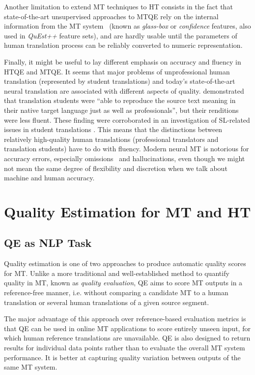 Another limitation to extend MT techniques to HT consists in the fact that state-of-the-art unsupervised approaches to \gls{MTQE} rely on the internal information from the MT system~\cite{Fomicheva2020} (known as \textit{glass-box} or \textit{confidence} features, also used in \textit{QuEst++} feature sets), and are hardly usable until the parameters of human translation process can be reliably converted to numeric representation.

Finally, it might be useful to lay different emphasis on accuracy and fluency in HTQE and MTQE. It seems that major problems of unprofessional human translation (represented by student translations) and today's state-of-the-art neural translation are associated with different aspects of quality. \citet{Carl2010} demonstrated that translation students were ``able to reproduce the source text meaning in their native target language just as well as professionals'', but their renditions were less fluent. These finding were corroborated in an investigation of SL-related issues in student translations \cite{Kunilovskaya2022err}. This means that the distinctions between relatively high-quality human translations (professional translators and translation students) have to do with fluency. 
Modern neural MT is notorious for accuracy errors, especially omissions~\cite[see, for example,][]{vanBrussel2018} and hallucinations, even though we might not mean the same degree of flexibility and discretion when we talk about machine and human accuracy.

\section{\label{sec:qe}Quality Estimation for MT and HT}
\subsection{\label{ssec:task}QE as NLP Task}
Quality estimation is one of two approaches to produce automatic quality scores for MT.
Unlike a more traditional and well-established method to quantify quality in MT, known as \textit{quality evaluation}, \gls{QE} aims to score MT outputs in a reference-free manner, i.e. without comparing a candidate MT to a human translation or several human translations of a given source segment. 

The major advantage of this approach over reference-based evaluation metrics is that QE can be used in online MT applications to score entirely unseen input, for which human reference translations are unavailable. QE is also designed to return results for individual data points rather than to evaluate the overall MT system performance. It is better at capturing quality variation between outputs of the same MT system. 

